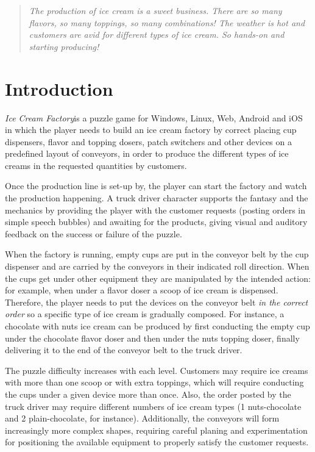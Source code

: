 \documentclass[a4paper]{scrartcl}
\title{\gamename}
\subtitle{Game Design Document}
\author{}
\date{\today}
\begin{document}
\newcommand{\gamename}{\emph{Ice Cream Factory}}

\maketitle

	\begin{quotation}
		\noindent
		\textit{The production of ice cream is a sweet business. There are so many flavors, so many toppings, so many combinations! The weather is hot and customers are avid for different types of ice cream. So hands-on and starting producing!}
	\end{quotation}

\section{Introduction}
	\gamename is a puzzle game for Windows, Linux, Web, Android and iOS in which the player needs to build an ice cream factory by correct placing cup dispensers, flavor and topping dosers, patch switchers and other devices on a predefined layout of conveyors, in order to produce the different types of ice creams in the requested quantities by customers.
	
	Once the production line is set-up by, the player can start the factory and watch the production happening. A truck driver character supports the fantasy and the mechanics by providing the player with the customer requests (posting orders in simple speech bubbles) and awaiting for the products, giving visual and auditory feedback on the success or failure of the puzzle.
	
	When the factory is running, empty cups are put in the conveyor belt by the cup dispenser and are carried by the conveyors in their indicated roll direction. When the cups get under other equipment they are manipulated by the intended action: for example, when under a flavor doser a scoop of ice cream is dispensed. Therefore, the player needs to put the devices on the conveyor belt \textit{in the correct order} so a specific type of ice cream is gradually composed. For instance, a chocolate with nuts ice cream can be produced by first conducting the empty cup under the chocolate flavor doser and then under the nuts topping doser, finally delivering it to the end of the conveyor belt to the truck driver.
	
	The puzzle difficulty increases with each level. Customers may require ice creams with more than one scoop or with extra toppings, which will require conducting the cups under a given device more than once. Also, the order posted by the truck driver may require different numbers of ice cream types (1 nuts-chocolate and 2 plain-chocolate, for instance). Additionally, the conveyors will form increasingly more complex shapes, requiring careful planing and experimentation for positioning the available equipment to properly satisfy the customer requests.
\end{document}
